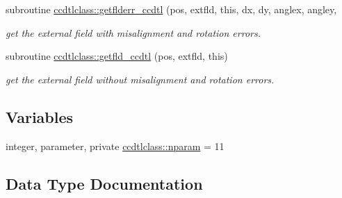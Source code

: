 \begin{DoxyCompactItemize}
subroutine \mbox{\hyperlink{namespaceccdtlclass_ab81d1b262943e405eebe3bfef401bb97}{ccdtlclass\+::getflderr\+\_\+ccdtl}} (pos, extfld, this, dx, dy, anglex, angley,
\begin{DoxyCompactList}\small\item\em get the external field with misalignment and rotation errors. \end{DoxyCompactList}\item 
subroutine \mbox{\hyperlink{namespaceccdtlclass_a62eb43f6a732d52951d468e91a2312cb}{ccdtlclass\+::getfld\+\_\+ccdtl}} (pos, extfld, this)
\begin{DoxyCompactList}\small\item\em get the external field without misalignment and rotation errors. \end{DoxyCompactList}\end{DoxyCompactItemize}
\subsection*{Variables}
\begin{DoxyCompactItemize}
\item 
integer, parameter, private \mbox{\hyperlink{namespaceccdtlclass_a0e8e95c86f2dab6639fc79f05859b6ea}{ccdtlclass\+::nparam}} = 11
\end{DoxyCompactItemize}


\subsection{Data Type Documentation}
\label{structccdtlclass_1_1ccdtl}
